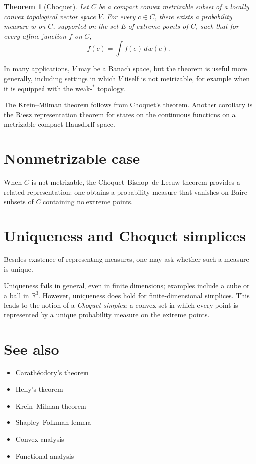 \documentclass[11pt]{article}
\newtheorem{theorem}{Theorem}
\begin{document}
\begin{theorem}[Choquet]
Let $C$ be a compact convex metrizable subset of a locally convex topological vector space $V$. For every $c \in C$, there exists a probability measure $w$ on $C$, supported on the set $E$ of extreme points of $C$, such that for every affine function $f$ on $C$,
\[
f(c) = \int f(e)\, dw(e).
\]
\end{theorem}

In many applications, $V$ may be a Banach space, but the theorem is useful more generally, including settings in which $V$ itself is not metrizable, for example when it is equipped with the weak-$^\ast$ topology.

The Krein--Milman theorem follows from Choquet's theorem. Another corollary is the Riesz representation theorem for states on the continuous functions on a metrizable compact Hausdorff space.

\section*{Nonmetrizable case}

When $C$ is not metrizable, the Choquet--Bishop--de Leeuw theorem provides a related representation: one obtains a probability measure that vanishes on Baire subsets of $C$ containing no extreme points.

\section*{Uniqueness and Choquet simplices}

Besides existence of representing measures, one may ask whether such a measure is unique.

Uniqueness fails in general, even in finite dimensions; examples include a cube or a ball in $\mathbb{R}^3$. However, uniqueness does hold for finite-dimensional simplices. This leads to the notion of a \emph{Choquet simplex}: a convex set in which every point is represented by a unique probability measure on the extreme points.

\section*{See also}

\begin{itemize}
    \item Carath\'eodory's theorem
    \item Helly's theorem
    \item Krein--Milman theorem
    \item Shapley--Folkman lemma
    \item Convex analysis
    \item Functional analysis
\end{itemize}
\end{document}
